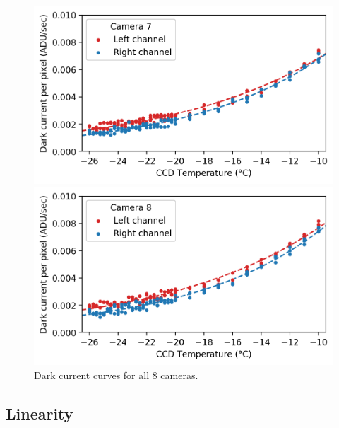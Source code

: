 \begin{colsection}
\begin{colsection}
\begin{figure}[p]
\begin{center}
        \begin{minipage}[t]{0.49\textwidth}\vspace{10pt}
            \includegraphics[width=\linewidth]{images/detectors/dc_7.png}
        \end{minipage}
        \begin{minipage}[t]{0.49\textwidth}\vspace{10pt}
            \includegraphics[width=\linewidth]{images/detectors/dc_8.png}
        \end{minipage}
    \end{center}
    \caption[Dark current curves for all 8 cameras]{
        Dark current curves for all 8 cameras.
        }\label{fig:dcs}
\end{figure}

\clearpage

\end{colsection}

\newpage
\subsection{Linearity}
\label{sec:linearity}
\begin{colsection}


\end{colsection}
\end{colsection}
